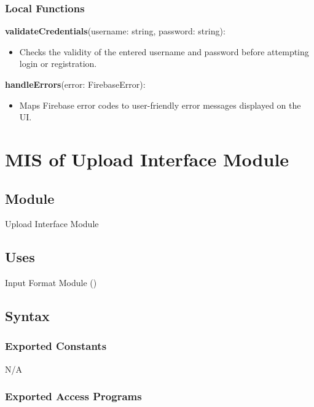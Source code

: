 \documentclass[12pt, titlepage]{article}
\begin{document}
\subsubsection{Local Functions}

\textbf{validateCredentials}(username: string, password: string):
\begin{itemize}
\item Checks the validity of the entered username and password before attempting login or registration.
\end{itemize}

\noindent\textbf{handleErrors}(error: FirebaseError):
\begin{itemize}
\item Maps Firebase error codes to user-friendly error messages displayed on the UI.
\end{itemize}

\newpage


\section{MIS of Upload Interface Module}\label{upload_interface_module}

\subsection{Module}

Upload Interface Module

\subsection{Uses}

Input Format Module ()

\subsection{Syntax}

\subsubsection{Exported Constants}
N/A

\subsubsection{Exported Access Programs}
\end{document}
